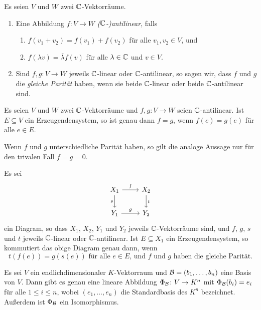 \documentclass[a4paper,10pt,numbers=noenddot]{scrartcl}
\begin{document}
\begin{definition}
  Es seien $V$ und $W$ zwei $\mathbb{C}$-Vektorräume.
  \begin{enumerate}[leftmargin=*]
    \item 
      Eine Abbildung $f \colon V \to W$ \emph{($\mathbb{C}$-)antilinear}, falls
      \begin{enumerate}
        \item
          $f(v_1 + v_2) = f(v_1) + f(v_2)$ für alle $v_1, v_2 \in V$, und
        \item
          $f(\lambda v) = \overline{\lambda} f(v)$ für alle $\lambda \in \mathbb{C}$ und $v \in V$.
      \end{enumerate}
    \item
      Sind $f, g \colon V \to W$ jeweils $\mathbb{C}$-linear oder $\mathbb{C}$-antilinear, so sagen wir, dass $f$ und $g$ die \emph{gleiche Parität} haben, wenn sie beide $\mathbb{C}$-linear oder beide $\mathbb{C}$-antilinear sind.
  \end{enumerate}
\end{definition}


\begin{lemma}
  Es seien $V$ und $W$ zwei $\mathbb{C}$-Vektorräume und $f, g \colon V \to W$ seien $\mathbb{C}$-antilinear.
  Ist $E \subseteq V$ ein Erzeugendensystem, so ist genau dann $f = g$, wenn $f(e) = g(e)$ für alle $e \in E$.
\end{lemma}


\begin{remark}
  Wenn $f$ und $g$ unterschiedliche Parität haben, so gilt die analoge Aussage nur für den trivalen Fall $f = g = 0$.
\end{remark}


\begin{corollary}
  Es sei
  \[
    \begin{tikzcd}
        X_1
        \arrow[r, "f"]
        \arrow[d, "s"']
      & X_2
        \arrow[d, "t"]
      \\
        Y_1
        \arrow[r, "g"]
      & Y_2
    \end{tikzcd}
  \]
  ein Diagram, so dass $X_1$, $X_2$, $Y_1$ und $Y_2$ jeweils $\mathbb{C}$-Vektorräume sind, und $f$, $g$, $s$ und $t$ jeweils $\mathbb{C}$-linear oder $\mathbb{C}$-antilinear.
  Ist $E \subseteq X_1$ ein Erzeugendensystem, so kommutiert das obige Diagram genau dann, wenn
  \[
    \text{$t(f(e)) = g(s(e))$ für alle $e \in E$, und $f$ und $g$ haben die gleiche Parität}.
  \]
\end{corollary}


\begin{lemma}
  Es sei $V$ ein endlichdimensionaler $K$-Vektorraum und $\mathcal{B} = (b_1, \dotsc, b_n)$ eine Basis von $V$.
  Dann gibt es genau eine lineare Abbildung $\Phi_{\mathcal{B}} \colon V \to K^n$ mit $\Phi_{\mathcal{B}}(b_i) = e_i$ für alle $1 \leq i \leq n$, wobei $(e_1, \dotsc, e_n)$ die Standardbasis des $K^n$ bezeichnet.
  Außerdem ist $\Phi_{\mathcal{B}}$ ein Isomorphismus.
\end{lemma}
\end{document}
